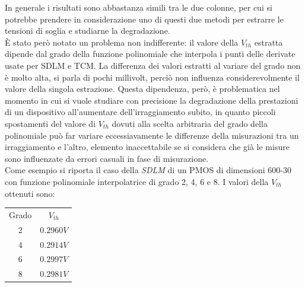 \documentclass[12pt, letterpaper]{book}
\begin{document}
In generale i risultati sono abbastanza simili tra le due colonne, per cui si potrebbe prendere in considerazione uno di questi due metodi  per estrarre le tensioni di soglia e studiarne la degradazione.\\
È stato però notato un problema non indifferente: il valore della $V_{th}$ estratta dipende dal grado della funzione polinomiale che interpola i punti delle derivate usate per SDLM e TCM. La differenza dei valori estratti al variare del grado non è molto alta, si parla di pochi millivolt, perciò non influenza considerevolmente il valore della singola estrazione. Questa dipendenza, però, è problematica nel momento in cui si vuole studiare con precisione la degradazione della prestazioni di un dispositivo all'aumentare dell'irraggiamento subito, in quanto piccoli spostamenti del valore di $V_{th}$ dovuti alla scelta arbitraria del grado della polinomiale può far variare eccessiavamente le differenze della misurazioni tra un irraggiamento e l'altro, elemento inaccettabile se si considera che già le misure sono influenzate da errori casuali in fase di misurazione.\\
Come esempio si riporta il caso della \emph{SDLM} di un PMOS di dimensioni 600-30 con funzione polinomiale interpolatrice di grado 2, 4, 6 e 8. I valori della $V_{th}$ ottenuti sono: 

\begin{center}
\begin{tabular}{c c}
Grado & $V_{th}$ \\
2  & $0.2960 V$ \\
4  & $0.2914 V$ \\
6  & $0.2997 V$ \\
8  & $0.2981 V$ \\

\end{tabular}
\end{center}
\end{document}
